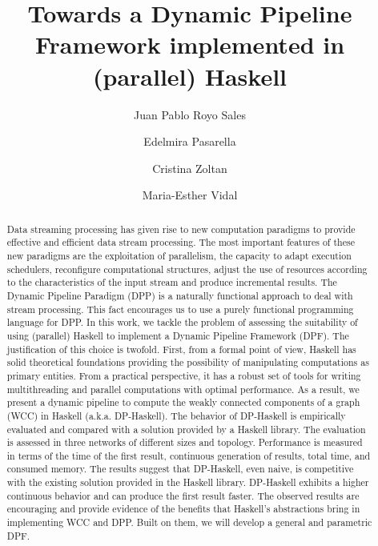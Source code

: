 \documentclass[preprint]{elsarticle}
\title{Towards a Dynamic Pipeline Framework implemented in (parallel) Haskell\tnoteref{t1}}
\author[1]{Juan Pablo Royo Sales}
\author[1]{Edelmira Pasarella}
\author[1]{Cristina Zoltan}
\author[2]{Maria-Esther Vidal}
\affiliation[1]{organization={Universitat Politecnica de Catalunya},
postcode={08034},
city={Barcelona},
country={Spain}}
\affiliation[2]{organization={TIB/L3S Research Centre at the University of Hannover},
city={Hannover},
country={Germany}}
\begin{document}
\begin{abstract}
Data streaming processing has given rise to new computation paradigms to provide effective and efficient data stream processing. The most important features of these new paradigms are the exploitation of parallelism, the capacity to adapt execution schedulers, reconfigure computational structures, adjust the use of resources according to the characteristics of the input stream and produce incremental results. The Dynamic Pipeline Paradigm (DPP) is a naturally functional approach to deal with stream processing. This fact encourages us to use a  purely functional programming language for  DPP.  In this work, we tackle the problem of assessing the suitability of using (parallel) Haskell to implement a Dynamic Pipeline Framework (DPF).  The justification of this choice is twofold. First,  from a formal point of view, Haskell has solid theoretical foundations providing the possibility of manipulating computations as primary entities. From a practical perspective,  it has a robust set of tools for writing multithreading and parallel computations with optimal performance. As a result, we present a dynamic pipeline to compute the weakly connected components of a graph (WCC) in Haskell (a.k.a. DP-Haskell). The behavior of DP-Haskell is empirically evaluated and compared with a solution provided by a Haskell library. The evaluation is assessed in three networks of different sizes and topology. Performance is measured in terms of the time of the first result, continuous generation of results, total time, and consumed memory. The results suggest that DP-Haskell, even naive, is competitive with the existing solution provided in the Haskell library. DP-Haskell exhibits a higher continuous behavior and can produce the first result faster. 
The observed results are encouraging and provide evidence of the benefits that Haskell's abstractions bring in implementing WCC and DPP. Built on them, we will develop a general and parametric DPF.



\end{abstract}
\end{document}
